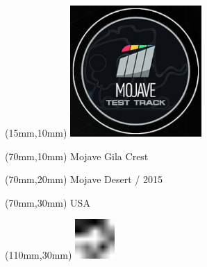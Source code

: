 \null\newpage
\begin{textblock*}{50mm}(15mm,10mm)%
\includegraphics[width=50mm]{LG/MOJA.png}
\end{textblock*}
\begin{textblock*}{130mm}(70mm,10mm)%
{\fontsize{20}{20}\selectfont Mojave Gila Crest}\\
\end{textblock*}
\begin{textblock*}{120mm}(70mm,20mm)%
{\fontsize{16}{16}\selectfont Mojave Desert / 2015}\\
\end{textblock*}
\begin{textblock*}{120mm}(70mm,30mm)%
{\fontsize{12}{12}\selectfont USA}
\end{textblock*}
\begin{textblock*}{30mm}(110mm,30mm)%
\centering
\includegraphics[height=15mm]{icons/fa-rotate-left.pdf}
\end{textblock*}

